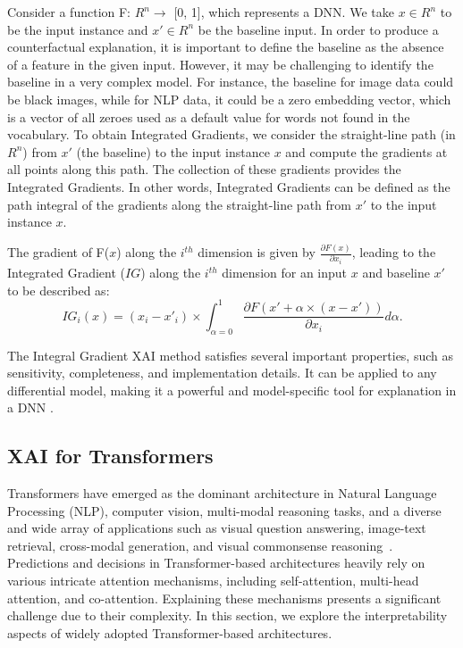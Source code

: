 \documentclass[final,5p,times,twocolumn]{elsarticle}
\begin{document}
Consider a function F: $R^{n} \rightarrow$ [0, 1], which represents a DNN. We take $x \in R^{n}$ to be the input instance and $x' \in R^{n}$ be the baseline input. In order to produce a counterfactual explanation, it is important to define the baseline as the absence of a feature in the given input. However, it may be challenging to identify the baseline in a very complex model. For instance, the baseline for image data could be black images, while for NLP data, it could be a zero embedding vector, which is a vector of all zeroes used as a default value for words not found in the vocabulary. To obtain Integrated Gradients, we consider the straight-line path (in $R^{n}$) from $x'$ (the baseline) to the input instance $x$ and compute the gradients at all points along this path. The collection of these gradients provides the Integrated Gradients. In other words, Integrated Gradients can be defined as the path integral of the gradients along the straight-line path from $x'$ to the input instance $x$.

The gradient of F($x$) along the $i^{th}$ dimension is given by $\frac{\partial F(x)} { \partial x_{i}}$, 
leading to the Integrated Gradient ($IG$) along the $i^{th}$ dimension for an input $x$ and baseline $x'$ to be described as:
\begin{equation}
IG_{i}(x) =(x_{i}-x'_{i})\times \int^{1}_{\alpha=0}\frac{\partial F(x' + \alpha \times (x-x'))}{\partial x_{i}} d\alpha. \label{eq:IG02}
\end{equation}

The Integral Gradient XAI method satisfies several important properties, such as sensitivity, completeness, and implementation details. It can be applied to any differential model, making it a powerful and model-specific tool for explanation in a DNN \cite{sundararajan2017axiomatic}.

\subsection{XAI for Transformers}
Transformers \cite{vaswani2017attention} have emerged as the dominant architecture in Natural Language Processing (NLP), computer vision, multi-modal reasoning tasks, and a diverse and wide array of applications such as visual question answering, image-text retrieval, cross-modal generation, and visual commonsense reasoning~\cite{chefer2021generic}. Predictions and decisions in Transformer-based architectures heavily rely on various intricate attention mechanisms, including self-attention, multi-head attention, and co-attention. %
Explaining these mechanisms presents a significant challenge due to their complexity. In this section, we explore the interpretability aspects of widely adopted Transformer-based architectures. 
\end{document}
